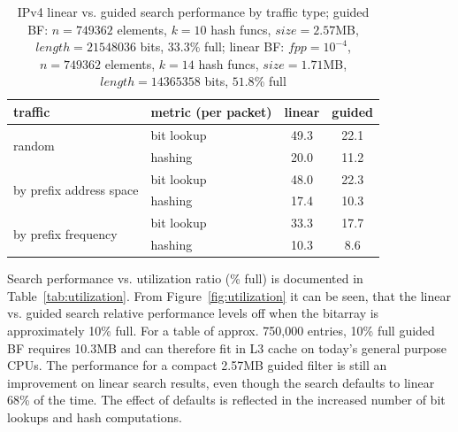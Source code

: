 \documentclass[conference,compsoc]{IEEEtran}
\begin{document}
\begin{table}[]
\centering
\caption{IPv4 linear vs. guided search performance by traffic type; guided BF: $n=749362$ elements, $k=10$ hash funcs, $size=2.57$MB, $length=21548036$ bits, $33.3$\% full;
linear BF: $fpp=10^{-4}$, $n=749362$ elements, $k=14$ hash funcs, $size=1.71$MB, $length=14365358$ bits, $51.8$\% full}
\label{tab:traffic}

\begin{tabular}{llccl}
\hline
\textbf{traffic}                         & \textbf{metric (per packet)} & \textbf{linear}          & \multicolumn{2}{l}{\textbf{guided}} \\ \hline
\multirow{2}{*}{random}                  & bit lookup      & 49.3                     & \multicolumn{2}{c}{22.1}            \\ %
                                         & hashing         & 20.0                     & \multicolumn{2}{c}{11.2}            \\ \hline
\multirow{2}{*}{by prefix address space} & bit lookup      & 48.0                     & \multicolumn{2}{c}{22.3}            \\ %
                                         & hashing         & 17.4                     & \multicolumn{2}{c}{10.3}            \\ \hline
\multirow{2}{*}{by prefix frequency}     & bit lookup      & 33.3                     & \multicolumn{2}{c}{17.7}            \\ %
                                         & hashing         & 10.3                     & \multicolumn{2}{c}{8.6}             \\ \hline
\end{tabular}
\end{table}

Search performance vs. utilization ratio (\% full) is documented in
Table~\ref{tab:utilization}. From Figure~\ref{fig:utilization} it can be
seen, that the linear vs. guided search relative performance levels off 
when the bitarray is approximately 10\% full. 
For a table of approx. 750,000 entries,
10\% full guided BF requires 10.3MB and can therefore fit in
L3 cache on today's general purpose CPUs. The performance for a
compact 2.57MB guided filter is still an improvement on linear search
results, even though the search
defaults to linear 68\% of the time. The effect of defaults is
reflected in the increased number of bit lookups and hash computations.
\end{document}
